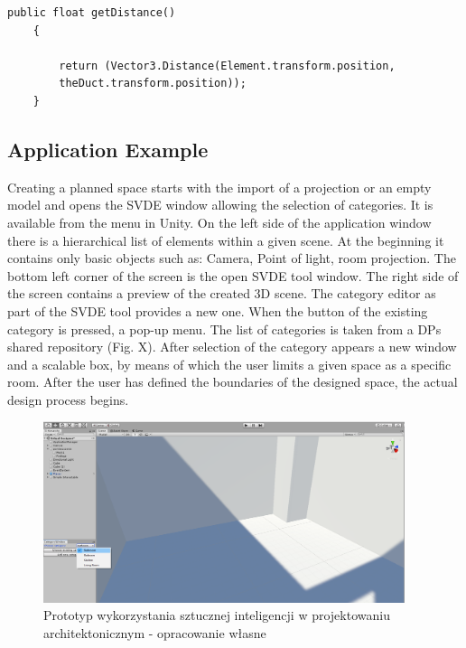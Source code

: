 \documentclass[runningheads]{llncs}
\begin{document}
\begin{lstlisting}[language={[Sharp]C}, caption={C\# exaple}, label={Script}]
public float getDistance()
    {

        return (Vector3.Distance(Element.transform.position, 
        theDuct.transform.position));
    }
\end{lstlisting}

\subsection{Application Example}
Creating a planned space starts with the import of a projection or an empty model and opens the SVDE window allowing the selection of categories. It is available from the menu in Unity. On the left side of the application window there is a hierarchical list of elements within a given scene. At the beginning it contains only basic objects such as: Camera, Point of light, room projection. The bottom left corner of the screen is the open SVDE tool window. The right side of the screen contains a preview of the created 3D scene. The category editor as part of the SVDE tool provides a new one. When the button of the existing category is pressed, a pop-up menu. The list of categories is taken from a DPs shared repository (Fig. X). After selection of the category appears a new window and a scalable box, by means of which the user limits a given space as a specific room. After the user has defined the boundaries of the designed space, the actual design process begins.

\begin{figure}[H]
\centering
\includegraphics[width=\textwidth, height=5.3cm]{editor1.png}
\caption{Prototyp wykorzystania sztucznej inteligencji w projektowaniu architektonicznym - opracowanie własne} \label{fig3}
\end{figure}
\end{document}
